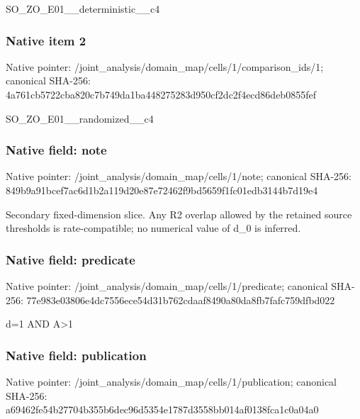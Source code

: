 \documentclass[10pt,a4paper]{article}
\begin{document}
\begingroup\raggedright\sloppy SO\_\allowbreak{}ZO\_\allowbreak{}E01\_\allowbreak{}\_\allowbreak{}deterministic\_\allowbreak{}\_\allowbreak{}c4\par\endgroup

\subsubsection{Native item 2}
Native pointer: /joint\_\allowbreak{}analysis/domain\_\allowbreak{}map/cells/1/comparison\_\allowbreak{}ids/1; canonical SHA-256: 4a761cb5722cba820c7b749da1ba448275283d950cf2dc2f4ecd86deb0855fef

\begingroup\raggedright\sloppy SO\_\allowbreak{}ZO\_\allowbreak{}E01\_\allowbreak{}\_\allowbreak{}randomized\_\allowbreak{}\_\allowbreak{}c4\par\endgroup

\subsubsection{Native field: note}
Native pointer: /joint\_\allowbreak{}analysis/domain\_\allowbreak{}map/cells/1/note; canonical SHA-256: 849b9a91bcef7ac6d1b2a119d20e87e72462f9bd5659f1fc01edb3144b7d19e4

\begingroup\raggedright\sloppy Secondary fixed-dimension slice. Any R2 overlap allowed by the retained source thresholds is rate-compatible;\allowbreak{} no numerical value of d\_\allowbreak{}0 is inferred.\par\endgroup

\subsubsection{Native field: predicate}
Native pointer: /joint\_\allowbreak{}analysis/domain\_\allowbreak{}map/cells/1/predicate; canonical SHA-256: 77e983e03806e4dc7556ece54d31b762cdaaf8490a80da8fb7fafc759dfbd022

\begingroup\raggedright\sloppy d=\allowbreak{}1 AND A>1\par\endgroup

\subsubsection{Native field: publication}
Native pointer: /joint\_\allowbreak{}analysis/domain\_\allowbreak{}map/cells/1/publication; canonical SHA-256: a69462fe54b27704b355b6dec96d5354e1787d3558bb014af0138fca1c0a04a0
\end{document}
